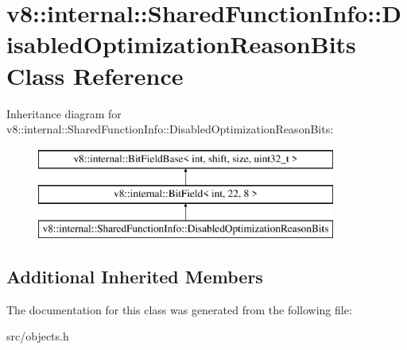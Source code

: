 \hypertarget{classv8_1_1internal_1_1_shared_function_info_1_1_disabled_optimization_reason_bits}{}\section{v8\+:\+:internal\+:\+:Shared\+Function\+Info\+:\+:Disabled\+Optimization\+Reason\+Bits Class Reference}
\label{classv8_1_1internal_1_1_shared_function_info_1_1_disabled_optimization_reason_bits}
Inheritance diagram for v8\+:\+:internal\+:\+:Shared\+Function\+Info\+:\+:Disabled\+Optimization\+Reason\+Bits\+:\begin{figure}[H]
\begin{center}
\leavevmode
\includegraphics[height=3.000000cm]{classv8_1_1internal_1_1_shared_function_info_1_1_disabled_optimization_reason_bits}
\end{center}
\end{figure}
\subsection*{Additional Inherited Members}


The documentation for this class was generated from the following file\+:\begin{DoxyCompactItemize}
\item 
src/objects.\+h\end{DoxyCompactItemize}
